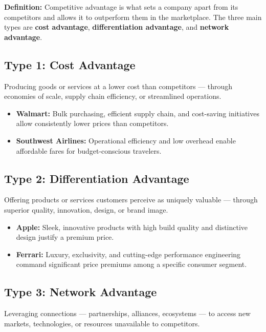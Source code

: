 \documentclass[11pt, letterpaper]{article}
\begin{document}
\begin{defbox}
\textbf{Definition:} Competitive advantage is what sets a company apart from its competitors and allows it to outperform them in the marketplace. The three main types are \textbf{cost advantage}, \textbf{differentiation advantage}, and \textbf{network advantage}.
\end{defbox}

\subsection{Type 1: Cost Advantage}
Producing goods or services at a lower cost than competitors --- through economies of scale, supply chain efficiency, or streamlined operations.

\begin{itemize}[leftmargin=*]
  \item \textbf{Walmart:} Bulk purchasing, efficient supply chain, and cost-saving initiatives allow consistently lower prices than competitors.
  \item \textbf{Southwest Airlines:} Operational efficiency and low overhead enable affordable fares for budget-conscious travelers.
\end{itemize}

\subsection{Type 2: Differentiation Advantage}
Offering products or services customers perceive as uniquely valuable --- through superior quality, innovation, design, or brand image.

\begin{itemize}[leftmargin=*]
  \item \textbf{Apple:} Sleek, innovative products with high build quality and distinctive design justify a premium price.
  \item \textbf{Ferrari:} Luxury, exclusivity, and cutting-edge performance engineering command significant price premiums among a specific consumer segment.
\end{itemize}

\subsection{Type 3: Network Advantage}
Leveraging connections --- partnerships, alliances, ecosystems --- to access new markets, technologies, or resources unavailable to competitors.
\end{document}
